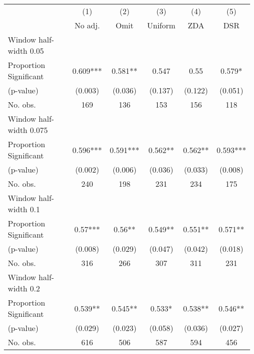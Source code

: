 
\def\sym#1{\ifmmode^{#1}\else\(^{#1}\)\fi}
\begin{tabular}{l*{5}{c}}
\hline\hline
& \multicolumn{1}{c}{(1)} &  \multicolumn{1}{c}{(2)} &  \multicolumn{1}{c}{(3)} &  \multicolumn{1}{c}{(4)} &  \multicolumn{1}{c}{(5)}\\
& \multicolumn{1}{c}{No adj.} &  \multicolumn{1}{c}{Omit} &  \multicolumn{1}{c}{Uniform} &  \multicolumn{1}{c}{ZDA} &  \multicolumn{1}{c}{DSR}\\

\hline
\hline
Window half-width 0.05\\

Proportion Significant& 0.609*** &  0.581** &  0.547 &  0.55 &  0.579*\\

(p-value) & (0.003) &  (0.036) &  (0.137) &  (0.122) &  (0.051)\\

No. obs.& 169 &  136 &  153 &  156 &  118\\

\hline
Window half-width 0.075\\

Proportion Significant& 0.596*** &  0.591*** &  0.562** &  0.562** &  0.593***\\

(p-value) & (0.002) &  (0.006) &  (0.036) &  (0.033) &  (0.008)\\

No. obs.& 240 &  198 &  231 &  234 &  175\\

\hline
Window half-width 0.1\\

Proportion Significant& 0.57*** &  0.56** &  0.549** &  0.551** &  0.571**\\

(p-value) & (0.008) &  (0.029) &  (0.047) &  (0.042) &  (0.018)\\

No. obs.& 316 &  266 &  307 &  311 &  231\\

\hline
Window half-width 0.2\\

Proportion Significant& 0.539** &  0.545** &  0.533* &  0.538** &  0.546**\\

(p-value) & (0.029) &  (0.023) &  (0.058) &  (0.036) &  (0.027)\\

No. obs.& 616 &  506 &  587 &  594 &  456\\


\end{tabular}
